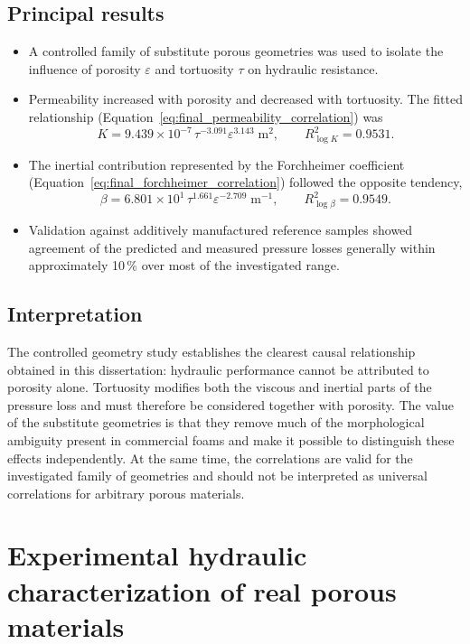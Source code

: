 \documentclass[a4paper]{article}
\begin{document}
\subsection*{Principal results}
\begin{itemize}
    \item A controlled family of substitute porous geometries was used to isolate the influence of porosity $\varepsilon$ and tortuosity $\tau$ on hydraulic resistance.
    \item Permeability increased with porosity and decreased with tortuosity. The fitted relationship (Equation~\ref{eq:final_permeability_correlation}) was
    \[
    K = 9.439\times10^{-7}\,\tau^{-3.091}\varepsilon^{3.143}\;\mathrm{m^2},
    \qquad R^2_{\log K}=0.9531.
    \]
    \item The inertial contribution represented by the Forchheimer coefficient (Equation~\ref{eq:final_forchheimer_correlation}) followed the opposite tendency,
    \[
    \beta = 6.801\times10^{1}\,\tau^{1.661}\varepsilon^{-2.709}\;\mathrm{m^{-1}},
    \qquad R^2_{\log \beta}=0.9549.
    \]
    \item Validation against additively manufactured reference samples showed agreement of the predicted and measured pressure losses generally within approximately 10\,\% over most of the investigated range.
\end{itemize}

\subsection*{Interpretation}
The controlled geometry study establishes the clearest causal relationship obtained in this dissertation: hydraulic performance cannot be attributed to porosity alone. Tortuosity modifies both the viscous and inertial parts of the pressure loss and must therefore be considered together with porosity. The value of the substitute geometries is that they remove much of the morphological ambiguity present in commercial foams and make it possible to distinguish these effects independently. At the same time, the correlations are valid for the investigated family of geometries and should not be interpreted as universal correlations for arbitrary porous materials.

\section{Experimental hydraulic characterization of real porous materials}
\end{document}
